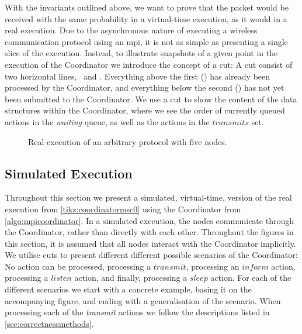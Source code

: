 With the invariants outlined above, we want to prove that the packet would be received with the same
probability in a virtual-time execution, as it would in a real execution. Due to the asynchronous nature
of executing a wireless communication protocol using an \gls{mpi}, it is not as simple as presenting a single
slice of the execution. Instead, to illustrate snapshots of a given point in the execution of the Coordinator
we introduce the concept of a cut: A cut consist of two horizontal lines, \ProcessedLine\ and \SubmittedLine.
Everything above the first (\ProcessedLine) has already been processed by the Coordinator, and everything
below the second (\SubmittedLine) has not yet been submitted to the Coordinator. We use a cut to show the
content of the data structures within the Coordinator, where we see the order of currently queued actions in
the \textit{waiting} queue, as well as the actions in the $\mathit{transmits}$ set.

\begin{figure}[H]
    \centering
    \caption{Real execution of an arbitrary protocol with five nodes.}\label{tikz:coordinatormsc0}
\end{figure}

\subsection{Simulated Execution}\label{sec:simulated-execution}
Throughout this section we present a simulated, virtual-time, version of the real execution from
\autoref{tikz:coordinatormsc0} using the Coordinator from \autoref{algo:mpicoordinator}. In a simulated
execution, the nodes communicate through the Coordinator, rather than directly with each other.
Throughout the figures in this section, it is assumed that all nodes interact with the Coordinator implicitly.
We utilise cuts to present different different possible scenarios of the Coordinator: No action can be
processed, processing a $\mathit{transmit}$, processing an $\mathit{inform}$ action, processing a
$\mathit{listen}$ action, and finally, processing a $\mathit{sleep}$ action. For each of the different
scenarios we start with a concrete example, basing it on the accompanying figure, and ending with a
generalisation of the scenario. When processing each of the \textit{transmit} actions we follow the
descriptions listed in \autoref{sec:correctnessmethods}.

